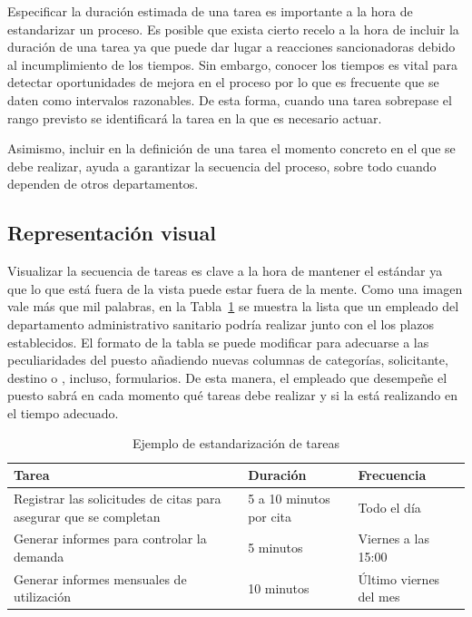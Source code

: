 Especificar la duración estimada de una tarea es importante a la hora de estandarizar un proceso.
Es posible que exista cierto recelo a la hora de incluir la duración de una tarea ya que puede dar lugar a reacciones sancionadoras debido al incumplimiento de los tiempos.
Sin embargo, conocer los tiempos es vital para detectar oportunidades de mejora en el proceso por lo que es frecuente que se daten como intervalos razonables.
De esta forma, cuando una tarea sobrepase el rango previsto se identificará la tarea en la que es necesario actuar.

Asimismo, incluir en la definición de una tarea el momento concreto en el que se debe realizar, ayuda a garantizar la secuencia del proceso, sobre todo cuando dependen de otros departamentos.

\subsection{Representación visual}

Visualizar la secuencia de tareas es clave a la hora de mantener el estándar ya que lo que está fuera de la vista puede estar fuera de la mente. Como una imagen vale más que mil palabras, en la Tabla~\ref{tab:ejemplo-estandar} se muestra la lista que un empleado del departamento administrativo sanitario podría realizar junto con el los plazos establecidos.
El formato de la tabla se puede modificar para adecuarse a las peculiaridades del puesto añadiendo nuevas columnas de categorías, solicitante, destino o , incluso, formularios.
De esta manera, el empleado que desempeñe el puesto sabrá en cada momento qué tareas debe realizar y si la está realizando en el tiempo adecuado.

\begin{table}[H]
    \centering
    \begin{tabular}{p{5cm}ll}
        \toprule
        Tarea                                                             & Duración                & Frecuencia             \\
        \midrule
        Registrar las solicitudes de citas para asegurar que se completan & 5 a 10 minutos por cita & Todo el día            \\
        Generar informes para controlar la demanda                        & 5 minutos               & Viernes a las 15:00    \\
        Generar informes mensuales de utilización                         & 10 minutos              & Último viernes del mes \\
        \bottomrule
    \end{tabular}
    \caption{Ejemplo de estandarización de tareas}
    \label{tab:ejemplo-estandar}
\end{table}

